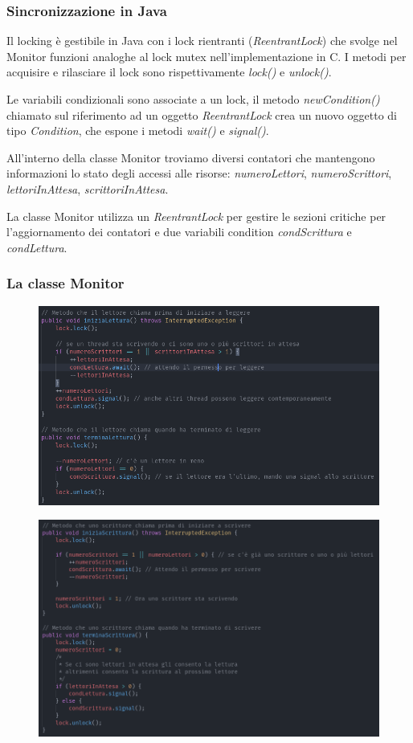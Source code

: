 \documentclass[10pt]{beamer}
\begin{document}
\begin{frame}
	\frametitle{Sincronizzazione in Java}
	Il locking è gestibile in Java con i lock rientranti (\emph{ReentrantLock}) che svolge nel Monitor funzioni analoghe al lock mutex nell'implementazione in C. I metodi per acquisire e rilasciare il lock sono rispettivamente \emph{lock()} e \emph{unlock()}.
	
	Le variabili condizionali sono associate a un lock, il metodo \emph{newCondition()} chiamato sul riferimento ad un oggetto \emph{ReentrantLock} crea un nuovo oggetto di tipo \emph{Condition}, che espone i metodi \emph{wait()} e \emph{signal()}.
	
	All'interno della classe Monitor troviamo diversi contatori che mantengono informazioni lo stato degli accessi alle risorse: \emph{numeroLettori}, \emph{numeroScrittori}, \emph{lettoriInAttesa}, \emph{scrittoriInAttesa}.
	
	La classe Monitor utilizza un \emph{ReentrantLock} per gestire le sezioni critiche per l'aggiornamento dei contatori e due variabili condition \emph{condScrittura} e \emph{condLettura}.
\end{frame}


\begin{frame}
	\frametitle{La classe Monitor}
		
			\begin{figure}
				\centering
				\includegraphics[width=0.52\linewidth]{img/monitor_lettore}
			\end{figure}
			
			
			\begin{figure}
				\centering
				\includegraphics[width=0.52\linewidth]{img/monitor_scrittore}
			\end{figure}
			
\end{frame}
\end{document}

